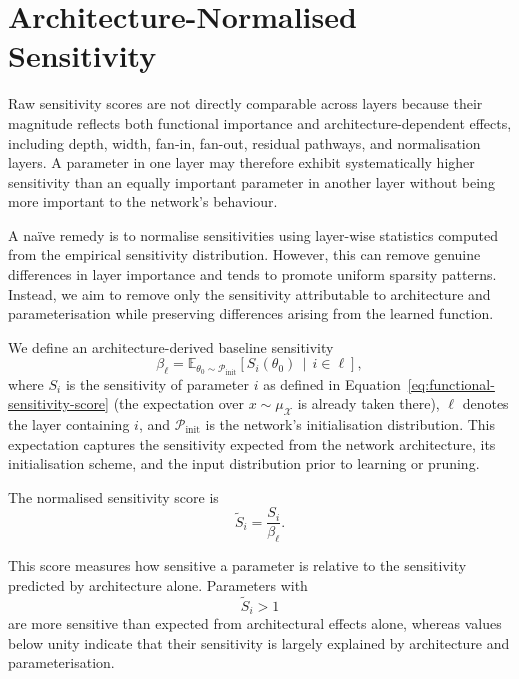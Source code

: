 \documentclass{article}
\theoremstyle{definition}
\theoremstyle{remark}
\begin{document}
\section{Architecture-Normalised Sensitivity}
\label{sec:normalisation}

Raw sensitivity scores are not directly comparable across layers because their magnitude reflects both functional importance and architecture-dependent effects, including depth, width, fan-in, fan-out, residual pathways, and normalisation layers. A parameter in one layer may therefore exhibit systematically higher sensitivity than an equally important parameter in another layer without being more important to the network's behaviour.

A naïve remedy is to normalise sensitivities using layer-wise statistics computed from the empirical sensitivity distribution. However, this can remove genuine differences in layer importance and tends to promote uniform sparsity patterns. Instead, we aim to remove only the sensitivity attributable to architecture and parameterisation while preserving differences arising from the learned function.

We define an architecture-derived baseline sensitivity
\begin{equation}
\beta_{\ell}
=
\mathbb{E}_{\theta_0 \sim \mathcal{P}_{\mathrm{init}}}
\!\left[
S_i(\theta_0)
\,\middle|\,
i \in \ell
\right],
\end{equation}
where $S_i$ is the sensitivity of parameter $i$ as defined in
Equation~\eqref{eq:functional-sensitivity-score} (the expectation over
$x\sim\mu_{\mathcal X}$ is already taken there), $\ell$ denotes the layer
containing $i$, and $\mathcal{P}_{\mathrm{init}}$ is the network's
initialisation distribution. This expectation captures the sensitivity expected from the network architecture, its initialisation scheme, and the input distribution prior to learning or pruning.

The normalised sensitivity score is
\begin{equation}
\widetilde{S}_i
=
\frac{S_i}{\beta_{\ell}}.
\end{equation}

This score measures how sensitive a parameter is relative to the sensitivity predicted by architecture alone. Parameters with  
\[
\widetilde{S}_i > 1
\]
are more sensitive than expected from architectural effects alone, whereas values below unity indicate that their sensitivity is largely explained by architecture and parameterisation.
\end{document}
